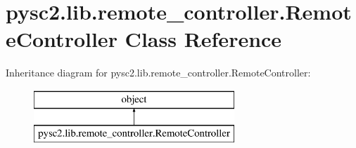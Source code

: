\hypertarget{classpysc2_1_1lib_1_1remote__controller_1_1_remote_controller}{}\section{pysc2.\+lib.\+remote\+\_\+controller.\+Remote\+Controller Class Reference}
\label{classpysc2_1_1lib_1_1remote__controller_1_1_remote_controller}
Inheritance diagram for pysc2.\+lib.\+remote\+\_\+controller.\+Remote\+Controller\+:\begin{figure}[H]
\begin{center}
\leavevmode
\includegraphics[height=2.000000cm]{classpysc2_1_1lib_1_1remote__controller_1_1_remote_controller}
\end{center}
\end{figure}
